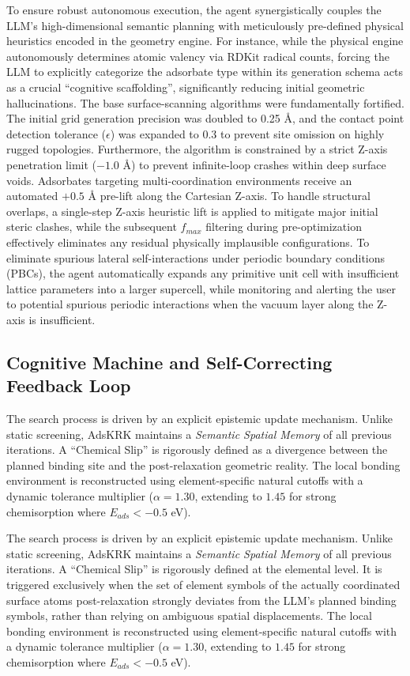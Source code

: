 \documentclass{article}
\begin{document}
To ensure robust autonomous execution, the agent synergistically couples the LLM's high-dimensional semantic planning with meticulously pre-defined physical heuristics encoded in the geometry engine. For instance, while the physical engine autonomously determines atomic valency via RDKit radical counts, forcing the LLM to explicitly categorize the adsorbate type within its generation schema acts as a crucial ``cognitive scaffolding'', significantly reducing initial geometric hallucinations. The base surface-scanning algorithms were fundamentally fortified. The initial grid generation precision was doubled to 0.25 \AA{}, and the contact point detection tolerance ($\epsilon$) was expanded to 0.3 to prevent site omission on highly rugged topologies. Furthermore, the algorithm is constrained by a strict Z-axis penetration limit ($-1.0$ \AA{}) to prevent infinite-loop crashes within deep surface voids. Adsorbates targeting multi-coordination environments receive an automated $+0.5$ \AA{} pre-lift along the Cartesian Z-axis. To handle structural overlaps, a single-step Z-axis heuristic lift is applied to mitigate major initial steric clashes, while the subsequent $f_{max}$ filtering during pre-optimization effectively eliminates any residual physically implausible configurations. To eliminate spurious lateral self-interactions under periodic boundary conditions (PBCs), the agent automatically expands any primitive unit cell with insufficient lattice parameters into a larger supercell, while monitoring and alerting the user to potential spurious periodic interactions when the vacuum layer along the Z-axis is insufficient.

\subsection{Cognitive Machine and Self-Correcting Feedback Loop}
The search process is driven by an explicit epistemic update mechanism. Unlike static screening, AdsKRK maintains a \textit{Semantic Spatial Memory} of all previous iterations. A ``Chemical Slip'' is rigorously defined as a divergence between the planned binding site and the post-relaxation geometric reality. The local bonding environment is reconstructed using element-specific natural cutoffs with a dynamic tolerance multiplier ($\alpha = 1.30$, extending to $1.45$ for strong chemisorption where $E_{ads} < -0.5$ eV).

The search process is driven by an explicit epistemic update mechanism. Unlike static screening, AdsKRK maintains a \textit{Semantic Spatial Memory} of all previous iterations. A ``Chemical Slip'' is rigorously defined at the elemental level. It is triggered exclusively when the set of element symbols of the actually coordinated surface atoms post-relaxation strongly deviates from the LLM's planned binding symbols, rather than relying on ambiguous spatial displacements. The local bonding environment is reconstructed using element-specific natural cutoffs with a dynamic tolerance multiplier ($\alpha = 1.30$, extending to $1.45$ for strong chemisorption where $E_{ads} < -0.5$ eV).
\end{document}
